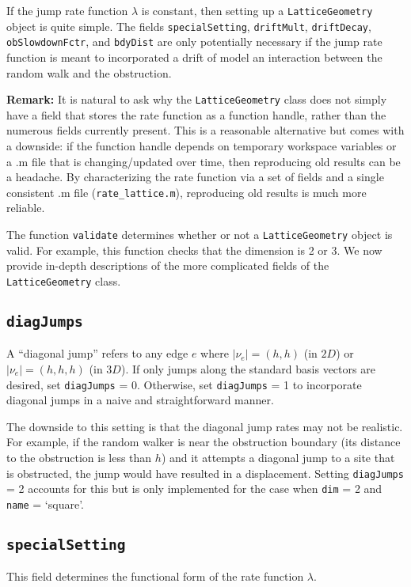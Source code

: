 \documentclass[11pt, oneside]{article}   	%
\theoremstyle{definition}
\begin{document}
If the jump rate function $\lambda$ is constant, then setting up a \texttt{LatticeGeometry} object is quite simple. The fields \texttt{specialSetting}, \texttt{driftMult}, \texttt{driftDecay}, \texttt{obSlowdownFctr}, and \texttt{bdyDist} are only potentially necessary if the jump rate function is meant to incorporated a drift of model an interaction between the random walk and the obstruction.

{\bf Remark:} It is natural to ask why the \texttt{LatticeGeometry} class does not simply have a field that stores the rate function as a function handle, rather than the numerous fields currently present. This is a reasonable alternative but comes with a downside: if the function handle depends on temporary workspace variables or a .m file that is changing/updated over time, then reproducing old results can be a headache. By characterizing the rate function via a set of fields and a single consistent .m file (\texttt{rate\_lattice.m}), reproducing old results is much more reliable.

The function \texttt{validate} determines whether or not a \texttt{LatticeGeometry} object is valid. For example, this function checks that the dimension is 2 or 3. We now provide in-depth descriptions of the more complicated fields of the \texttt{LatticeGeometry} class.

\subsection{\texttt{diagJumps}}
A ``diagonal jump'' refers to any edge $e$ where $|\nu_e| = (h,h)$ (in $2D$) or $|\nu_e| = (h,h,h)$ (in $3D$). If only jumps along the standard basis vectors are desired, set \texttt{diagJumps} = 0. Otherwise, set \texttt{diagJumps} = 1 to incorporate diagonal jumps in a naive and straightforward manner.

The downside to this setting is that the diagonal jump rates may not be realistic. For example, if the random walker is near the obstruction boundary (its distance to the obstruction is less than $h$) and it attempts a diagonal jump to a site that is obstructed, the jump would have resulted in a displacement. Setting \texttt{diagJumps} = 2 accounts for this but is only implemented for the case when \texttt{dim} = 2 and \texttt{name} = `square'.

\subsection{\texttt{specialSetting}}
This field determines the functional form of the rate function $\lambda$.
\end{document}
